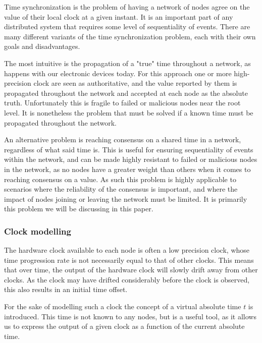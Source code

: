 \documentclass[a4paper,12pt]{article}
\begin{document}

Time synchronization is the problem of having a network of nodes agree on the value of their local clock at a given instant. It is an important part of any distributed system that requires some level of sequentiality of events. There are many different variants of the time synchronization problem, each with their own goals and disadvantages.

The most intuitive is the propagation of a "true" time throughout a network, as happens with our electronic devices today. For this approach one or more high-precision clock are seen as authoritative, and the value reported by them is propagated throughout the network and accepted at each node as the absolute truth. Unfortunately this is fragile to failed or malicious nodes near the root level. It is nonetheless the problem that must be solved if a known time must be propagated throughout the network.

An alternative problem is reaching consensus on a shared time in a network, regardless of what said time is. This is useful for ensuring sequentiality of events within the network, and can be made highly resistant to failed or malicious nodes in the network, as no nodes have a greater weight than others when it comes to reaching consensus on a value. As such this problem is highly applicable to scenarios where the reliability of the consensus is important, and where the impact of nodes joining or leaving the network must be limited. It is primarily this problem we will be discussing in this paper.

\subsubsection{Clock modelling}

The hardware clock available to each node is often a low precision clock, whose time progression rate is not necessarily equal to that of other clocks. This means that over time, the output of the hardware clock will slowly drift away from other clocks. As the clock may have drifted considerably before the clock is observed, this also results in an initial time offset.

For the sake of modelling such a clock the concept of a virtual absolute time $t$ is introduced. This time is not known to any nodes, but is a useful tool, as it allows us to express the output of a given clock as a function of the current absolute time.
\end{document}
